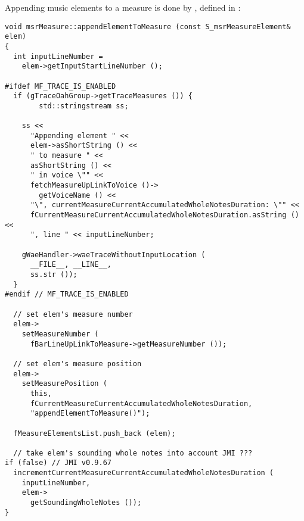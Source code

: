 Appending music elements to a measure is done by , defined in :%
\begin{lstlisting}[language=CPlusPlus]
void msrMeasure::appendElementToMeasure (const S_msrMeasureElement& elem)
{
  int inputLineNumber =
    elem->getInputStartLineNumber ();

#ifdef MF_TRACE_IS_ENABLED
  if (gTraceOahGroup->getTraceMeasures ()) {
		std::stringstream ss;

    ss <<
      "Appending element " <<
      elem->asShortString () <<
      " to measure " <<
      asShortString () <<
      " in voice \"" <<
      fetchMeasureUpLinkToVoice ()->
        getVoiceName () <<
      "\", currentMeasureCurrentAccumulatedWholeNotesDuration: \"" <<
      fCurrentMeasureCurrentAccumulatedWholeNotesDuration.asString () <<
      ", line " << inputLineNumber;

    gWaeHandler->waeTraceWithoutInputLocation (
      __FILE__, __LINE__,
      ss.str ());
  }
#endif // MF_TRACE_IS_ENABLED

  // set elem's measure number
  elem->
    setMeasureNumber (
      fBarLineUpLinkToMeasure->getMeasureNumber ());

  // set elem's measure position
  elem->
    setMeasurePosition (
      this,
      fCurrentMeasureCurrentAccumulatedWholeNotesDuration,
      "appendElementToMeasure()");

  fMeasureElementsList.push_back (elem);

  // take elem's sounding whole notes into account JMI ???
if (false) // JMI v0.9.67
  incrementCurrentMeasureCurrentAccumulatedWholeNotesDuration (
    inputLineNumber,
    elem->
      getSoundingWholeNotes ());
}
\end{lstlisting}

